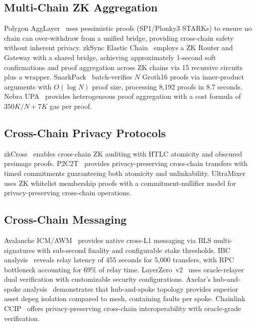 \documentclass[conference]{IEEEtran}
\begin{document}
\subsection{Multi-Chain ZK Aggregation}

Polygon AggLayer~\cite{agglayer2024} uses pessimistic proofs (SP1/Plonky3
STARKs) to ensure no chain can over-withdraw from a unified bridge, providing
cross-chain safety without inherent privacy. zkSync Elastic
Chain~\cite{zksync2024} employs a ZK Router and Gateway with a shared
bridge, achieving approximately 1-second soft confirmations and proof
aggregation across ZK chains via 15 recursive circuits plus a wrapper.
SnarkPack~\cite{snarkpack2022} batch-verifies $N$ Groth16 proofs via
inner-product arguments with $O(\log N)$ proof size, processing 8,192 proofs
in 8.7 seconds. Nebra UPA~\cite{nebra2024} provides heterogeneous proof
aggregation with a cost formula of $350K/N + 7K$ gas per proof.

\subsection{Cross-Chain Privacy Protocols}

zkCross~\cite{zkcross2024} enables cross-chain ZK auditing with HTLC
atomicity and obscured preimage proofs. P2C2T~\cite{p2c2t2024} provides
privacy-preserving cross-chain transfers with timed commitments guaranteeing
both atomicity and unlinkability. UltraMixer~\cite{ultramixer2025} uses ZK
whitelist membership proofs with a commitment-nullifier model for
privacy-preserving cross-chain operations.

\subsection{Cross-Chain Messaging}

Avalanche ICM/AWM~\cite{icm2025} provides native cross-L1 messaging via BLS
multi-signatures with sub-second finality and configurable stake thresholds.
IBC analysis~\cite{ibc2023} reveals relay latency of 455 seconds for 5,000
transfers, with RPC bottleneck accounting for 69\% of relay time.
LayerZero~v2~\cite{layerzero2025} uses oracle-relayer dual verification with
customizable security configurations. Axelar's hub-and-spoke
analysis~\cite{axelar2024} demonstrates that hub-and-spoke topology provides
superior asset depeg isolation compared to mesh, containing faults per spoke.
Chainlink CCIP~\cite{ccip2024} offers privacy-preserving cross-chain
interoperability with oracle-grade verification.
\end{document}
